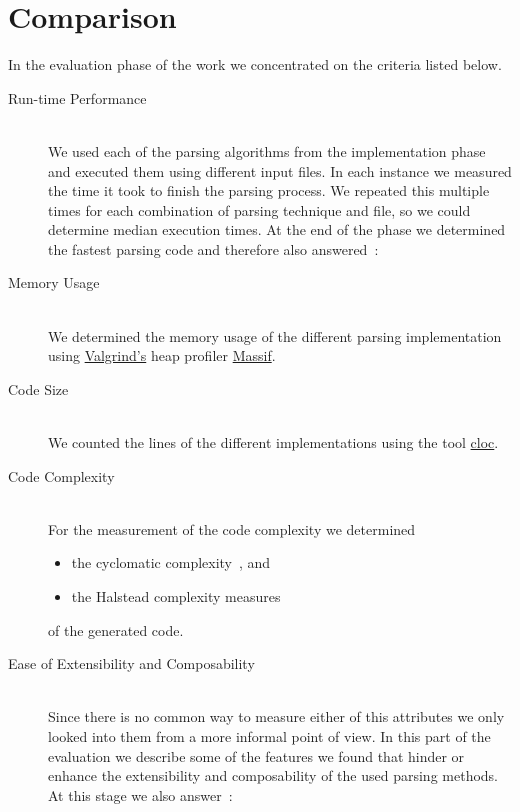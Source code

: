 \chapter{Comparison}

In the evaluation phase of the work we concentrated on the criteria listed below.

\begin{description}

  \item[Run-time Performance]~\\[0.1cm]
  We used each of the parsing algorithms from the implementation phase and executed them using different input files. In each instance we measured the time it took to finish the parsing process. We repeated this multiple times for each combination of parsing technique and file, so we could determine median execution times. At the end of the phase we determined the fastest parsing code and therefore also answered~:

  \speed*

  \item[Memory Usage]~\\[0.1cm]
  We determined the memory usage of the different parsing implementation using \href{http://valgrind.org}{Valgrind's} heap profiler \href{http://valgrind.org/docs/manual/ms-manual.html}{Massif}.

  \item[Code Size]~\\[0.1cm]
  We counted the lines of the different implementations using the tool \href{https://github.com/AlDanial/cloc}{cloc}.

  \item[Code Complexity]~\\[0.1cm]
  For the measurement of the code complexity we determined
  \begin{itemize}
    \item the cyclomatic complexity~\cite{mccabe1976complexity}, and
    \item the Halstead complexity measures~\cite{halstead1977elements}
  \end{itemize}
  of the generated code.

  \item[Ease of Extensibility and Composability]~\\[0.1cm]
  Since there is no common way to measure either of this attributes we only looked into them from a more informal point of view. In this part of the evaluation we describe some of the features we found that hinder or enhance the extensibility and composability of the used parsing methods. At this stage we also answer~:


\end{description}
